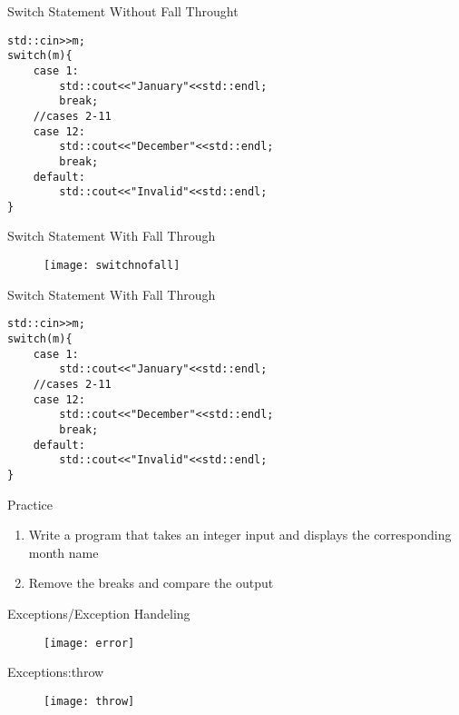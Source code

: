 \documentclass[xcolor={dvipsnames}]{beamer}
\begin{document}
\begin{frame}[fragile]{Switch Statement Without Fall Throught}
\begin{verbatim}
std::cin>>m;
switch(m){
    case 1: 
        std::cout<<"January"<<std::endl; 
        break;
    //cases 2-11
    case 12:
        std::cout<<"December"<<std::endl;
        break;
    default:
        std::cout<<"Invalid"<<std::endl;
}
\end{verbatim}
\end{frame}

\begin{frame}{Switch Statement With Fall Through}
\begin{center}	
	\begin{figure}
		\texttt{[image: switchnofall]}
	\end{figure}
	\end{center}
\end{frame}

\begin{frame}[fragile]{Switch Statement With Fall Through}
\begin{verbatim}
std::cin>>m;
switch(m){
    case 1: 
        std::cout<<"January"<<std::endl; 
    //cases 2-11
    case 12:
        std::cout<<"December"<<std::endl;
        break;
    default:
        std::cout<<"Invalid"<<std::endl;
}
\end{verbatim}
\end{frame}

\begin{frame}{Practice}
	\begin{enumerate}
		\item Write a program that takes an integer input and displays the corresponding month name 
		\item Remove the breaks and compare the output
	\end{enumerate}
\end{frame}

\begin{frame}{Exceptions/Exception Handeling}
\begin{center}	
	\begin{figure}
		\texttt{[image: error]}
	\end{figure}
\end{center}
\end{frame}

\begin{frame}{Exceptions:throw}
\begin{center}	
	\begin{figure}
		\texttt{[image: throw]}
	\end{figure}
\end{center}
\end{frame}
\end{document}
